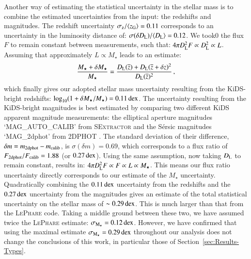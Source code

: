 \documentclass{aa}
\newcommand{\dex}{\,{\rm dex}}
\newcommand*{\meanl}[1]{\overline{#1}}
\newcommand*{\meanb}[1]{\langle{#1}\rangle}
\newcommand{\un}[1]{_{\rm #1}}
\begin{document}
Another way of estimating the statistical uncertainty in the stellar mass is to combine the estimated uncertainties from the input: the redshifts and magnitudes. The redshift uncertainty $\sigma\un{z}/\meanb{z\un{G}} = 0.11$ corresponds to an uncertainty in the luminosity distance of: $\sigma(\delta D\un{L})/\meanb{D\un{L}} = 0.12$. We took0 the flux $F$ to remain constant between measurements, such that: $4 \pi D\un{L}^2 F \propto D\un{L}^2 \propto L$. Assuming that approximately $L \propto M_\star$ leads to an estimate: 
\begin{equation}
\frac{M_\star + \delta M_\star}{M_\star} = \frac{D\un{L}(\meanl{z}) + D\un{L}(\meanl{z}+\delta z)^2}{D\un{L}(\meanl{z})^2} \, ,
\end{equation}
which finally gives our adopted stellar mass uncertainty resulting from the KiDS-bright redshifts: $\log_{10}(1+\delta M_\star/M_\star) = 0.11 \dex$. The uncertainty resulting from the KiDS-bright magnitudes is best estimated by comparing two different KiDS apparent magnitude measurements: the elliptical aperture magnitudes `MAG\_AUTO\_CALIB' from \textsc{SExtractor} and the S\'ersic magnitudes `MAG\_2dphot' from \textsc{2DPHOT} \cite[]{barbera2008}. The standard deviation of their difference, $\delta m = m\un{2dphot} - m\un{calib}$, is $\sigma(\delta m) = 0.69$, which corresponds to a flux ratio of $F\un{2dphot}/F\un{calib} = 1.88$ (or $0.27 \dex$). Using the same assumption, now taking $D\un{L}$ to remain constant, results in: $4 \pi D\un{L}^2 F \propto F \propto L \propto M_\star$. This means our flux ratio uncertainty directly corresponds to our estimate of the $M_\star$ uncertainty. Quadratically combining the $0.11 \dex$ uncertainty from the redshifts and the $0.27 \dex$ uncertainty from the magnitudes gives an estimate of the total statistical uncertainty on the stellar mass of $\sim0.29\dex$. This is much larger than that from the \textsc{LePhare} code. Taking a middle ground between these two, we have assumed twice the \textsc{LePhare} estimate: $\sigma\un{M_\star} = 0.12 \dex$. However, we have confirmed that using the maximal estimate $\sigma\un{M_\star} = 0.29\dex$ throughout our analysis does not change the conclusions of this work, in particular those of Section~\ref{sec:Results-Types}.
\end{document}
